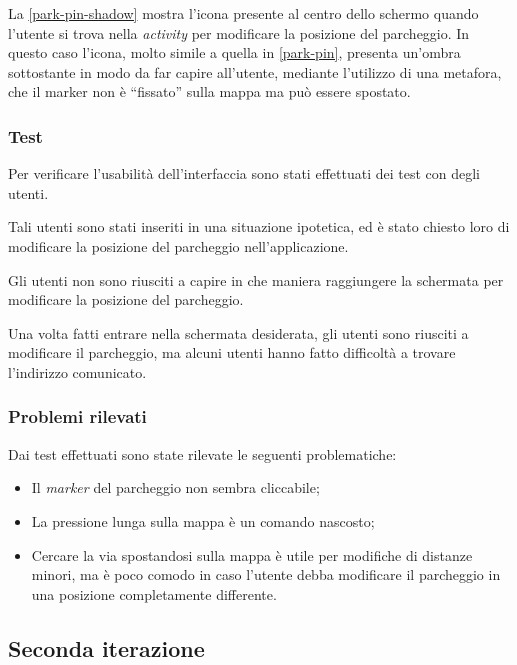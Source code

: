 La \autoref{park-pin-shadow} mostra l'icona presente al centro dello schermo quando l'utente si trova nella \emph{activity} per modificare la posizione del parcheggio. In questo caso l'icona, molto simile a quella in \autoref{park-pin}, presenta un'ombra sottostante in modo da far capire all'utente, mediante l'utilizzo di una metafora, che il marker non è ``fissato'' sulla mappa ma può essere spostato.

\hypertarget{test}{%
\subsubsection{Test}\label{test}}

Per verificare l'usabilità dell'interfaccia sono stati effettuati dei test con degli utenti.

Tali utenti sono stati inseriti in una situazione ipotetica, ed è stato chiesto loro di modificare la posizione del parcheggio nell'applicazione.

Gli utenti non sono riusciti a capire in che maniera raggiungere la schermata per modificare la posizione del parcheggio.

Una volta fatti entrare nella schermata desiderata, gli utenti sono riusciti a modificare il parcheggio, ma alcuni utenti hanno fatto difficoltà a trovare l'indirizzo comunicato.

\hypertarget{problemi-rilevati}{%
\subsubsection{Problemi rilevati}\label{problemi-rilevati}}

Dai test effettuati sono state rilevate le seguenti problematiche:

\begin{itemize}
    \item Il \emph{marker} del parcheggio non sembra cliccabile;
    \item La pressione lunga sulla mappa è un comando nascosto;
    \item Cercare la via spostandosi sulla mappa è utile per modifiche di distanze minori, ma è poco comodo in caso l'utente debba modificare il parcheggio in una posizione completamente differente.
\end{itemize}
\hypertarget{seconda-iterazione}{%
\subsection{Seconda iterazione}\label{seconda-iterazione}}


